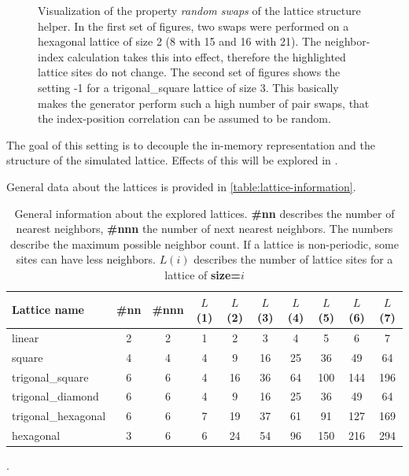 \begin{figure}[htbp]
    \vspace{0.2cm}
    \caption{Visualization of the property \emph{random swaps} of the lattice structure helper. In the first set of figures, two swaps were performed on a hexagonal lattice of size 2 (8 with 15 and 16 with 21). The neighbor-index calculation takes this into effect, therefore the highlighted lattice sites do not change. The second set of figures shows the setting -1 for a trigonal\_square lattice of size 3. This basically makes the generator perform such a high number of pair swaps, that the index-position correlation can be assumed to be random. 
    }
    \label{fig:direct-comparison-lattice-site-swaps}
\end{figure}

The goal of this setting is to decouple the in-memory representation and the structure of the simulated lattice. 
Effects of this will be explored in .

General data about the lattices is provided in \autoref{table:lattice-information}.

\begin{table}[htbp]
    \centering
    \begin{tabular}{l|cc|ccccccc} 
        \toprule
        Lattice name & \#nn & \#nnn &$L$(1)&$L$(2)&$L$(3)&$L$(4)&$L$(5)&$L$(6)&$L$(7)\\  
        \midrule 
        linear & 2 & 2 & 1 & 2 & 3 & 4 & 5 & 6 & 7\\
        square & 4 & 4 & 4 & 9 & 16 & 25 & 36 & 49 & 64\\
        trigonal\_square & 6 & 6 & 4 & 16 & 36 & 64 & 100 & 144 & 196\\
        trigonal\_diamond & 6 & 6 & 4 & 9 & 16 & 25 & 36 & 49 & 64\\
        trigonal\_hexagonal & 6 & 6 & 7 & 19 & 37 & 61 & 91 & 127 & 169\\
        hexagonal & 3 & 6 & 6 & 24 & 54 & 96 & 150 & 216 & 294\\
        \bottomrule
    \end{tabular}
    \vspace{0.5cm}
    \caption{General information about the explored lattices. \textbf{\#nn} describes the number of nearest neighbors, \textbf{\#nnn} the number of next nearest neighbors. The numbers describe the maximum possible neighbor count. If a lattice is non-periodic, some sites can have less neighbors. $L(i)$ describes the number of lattice sites for a lattice of \textbf{size=$i$}}.
    \label{table:lattice-information}
\end{table}




